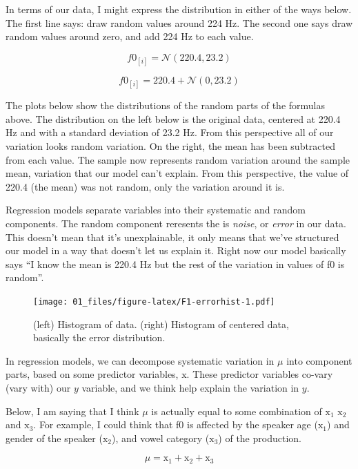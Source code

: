 \documentclass[
]{book}
\begin{document}
In terms of our data, I might express the distribution in either of the ways below. The first line says: draw random values around 224 Hz. The second one says draw random values around zero, and add 224 Hz to each value.

\[
f0_{[i]} = \mathcal{N}(220.4,23.2)
\label{eq:3}
\]

\[
f0_{[i]} = 220.4 + \mathcal{N}(0,23.2)
\label{eq:4}
\]

The plots below show the distributions of the random parts of the formulas above. The distribution on the left below is the original data, centered at 220.4 Hz and with a standard deviation of 23.2 Hz. From this perspective all of our variation looks random variation. On the right, the mean has been subtracted from each value. The sample now represents random variation around the sample mean, variation that our model can't explain. From this perspective, the value of 220.4 (the mean) was not random, only the variation around it is.

Regression models separate variables into their systematic and random components. The random component reresents the is \emph{noise}, or \emph{error} in our data. This doesn't mean that it's unexplainable, it only means that we've structured our model in a way that doesn't let us explain it. Right now our model basically says ``I know the mean is 220.4 Hz but the rest of the variation in values of f0 is random''.

\begin{figure}
\centering
\texttt{[image: 01\_files/figure-latex/F1-errorhist-1.pdf]}
\caption{\label{fig:F1-errorhist}(left) Histogram of data. (right) Histogram of centered data, basically the error distribution.}
\end{figure}

In regression models, we can decompose systematic variation in \(\mu\) into component parts, based on some predictor variables, \(\mathrm{x}\). These predictor variables co-vary (vary with) our \(y\) variable, and we think help explain the variation in \(y\).

Below, I am saying that I think \(\mu\) is actually equal to some combination of \(\mathrm{x}_{1}\) \(\mathrm{x}_{2}\) and \(\mathrm{x}_{3}\). For example, I could think that f0 is affected by the speaker age (\(\mathrm{x}_{1}\)) and gender of the speaker (\(\mathrm{x}_{2}\)), and vowel category (\(\mathrm{x}_{3}\)) of the production.

\[
\mu = \mathrm{x}_{1} + \mathrm{x}_{2} + \mathrm{x}_{3}
\label{eq:5}
\]
\end{document}
